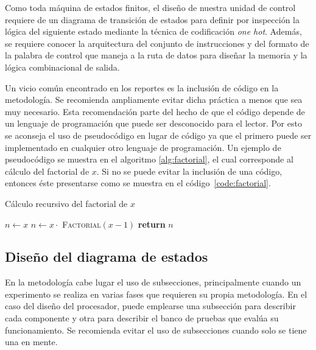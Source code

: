 \documentclass[12pt]{article}
\begin{document}
Como toda máquina de estados finitos, el diseño de nuestra unidad de control 
requiere de un diagrama de transición de estados para definir
por inspección la lógica del siguiente estado mediante la técnica de 
codificación \textit{one hot}. Además, se requiere conocer la arquitectura del 
conjunto de instrucciones y del formato de la palabra de control que maneja a
la ruta de datos para diseñar la memoria y la lógica combinacional de salida.

Un vicio común encontrado en los reportes es la inclusión de código en la 
metodología. Se recomienda ampliamente evitar dicha práctica a menos que sea 
muy necesario. Esta recomendación parte del hecho de que el código depende de 
un lenguaje de programación que puede ser desconocido para el lector. Por esto 
se aconseja el uso de pseudocódigo en lugar de código ya que el primero puede 
ser implementado en cualquier otro lenguaje de programación. Un ejemplo de 
pseudocódigo se muestra en el algoritmo \ref{alg:factorial}, el cual 
corresponde al cálculo del factorial de $x$. Si no se puede evitar la 
inclusión de una código, entonces éste presentarse como se muestra en el 
código~\ref{code:factorial}.

\begin{center}
  \begin{minipage}[t]{0.5\textwidth}
    \begin{algorithm}[H]
      \caption{Cálculo recursivo del factorial de $x$}\label{alg:factorial}
      \begin{algorithmic}[1]
            \State $n \gets x$
          \Else
            \State $n \gets x \cdot $ \textsc{Factorial}$(x-1)$
          \EndIf
          \State \textbf{return} $n$
          \EndProcedure
      \end{algorithmic}
    \end{algorithm}
  \end{minipage}
\end{center}



\subsection{Diseño del diagrama de estados}
En la metodología cabe lugar el uso de subsecciones, principalmente cuando un 
experimento se realiza en varias fases que requieren su propia metodología. En 
el caso del diseño del procesador, puede emplearse una subsección para 
describir cada componente y otra para describir el 
banco de pruebas que evalúa su funcionamiento. Se recomienda evitar el uso 
de subsecciones cuando solo se tiene una en mente.
\end{document}
